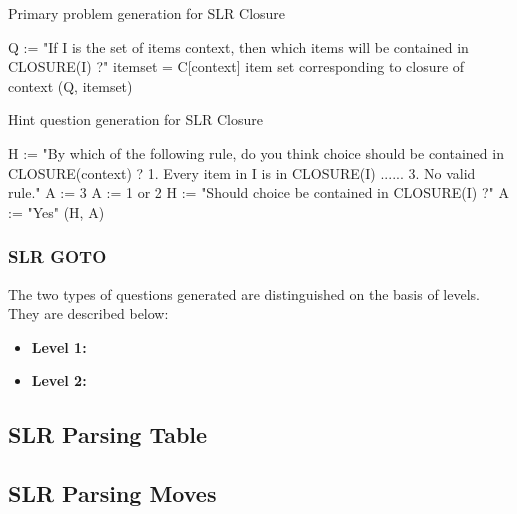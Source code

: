 \begin{algorithm}
\caption{Primary problem generation for SLR Closure}
\label{algo:primary-SlrClosure}
\begin{algorithmic}[1]
\State Q := "If I is the set of items context, then which items will be contained in CLOSURE(I) ?"
\State itemset = C[context] \Comment item set corresponding to closure of context
\State \Return (Q, itemset)
\EndFunction
\end{algorithmic}
\end{algorithm}

\begin{algorithm}
\caption{Hint question generation for SLR Closure}
\label{algo:hint-slrclosure}
\begin{algorithmic}[1]
\State H := "By which of the following rule, do you think choice should be contained in CLOSURE(context) ? 1. Every item in I is in CLOSURE(I) ...... 3. No valid rule."
\State A := 3
\State A := 1 or 2
\EndIf
{}
\State H := "Should choice be contained in CLOSURE(I) ?"
\State A := "Yes"
\EndIf
\State \Return (H, A)
\EndFunction
\end{algorithmic}
\end{algorithm}

\subsubsection{SLR GOTO}
\label{ssec:slrgoto}

The two types of questions generated are distinguished on the basis of levels. They are described below:
\begin{itemize}
\item \textbf{Level 1:}
\item \textbf{Level 2:}
\end{itemize}

\subsection{SLR Parsing Table}
\label{subsec:slrtable}

\subsection{SLR Parsing Moves}
\label{subsec:slrmoves}

